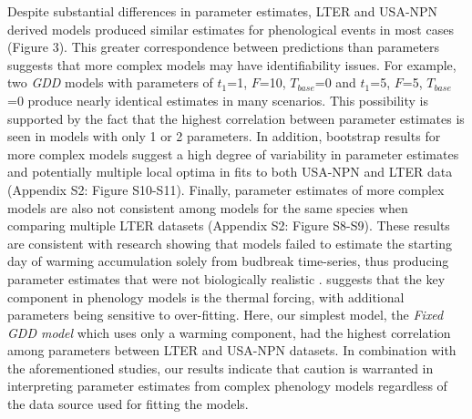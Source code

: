 \documentclass[fleqn,12pt,lineno]{article}
\begin{document}
Despite substantial differences in parameter estimates, LTER and USA-NPN derived models produced similar estimates for phenological events in most cases (Figure 3). This greater correspondence between predictions than parameters suggests that more complex models may have identifiability issues. For example, two \textit{GDD} models with parameters of $t_{1}$=1, $F$=10, $T_{base}$=0 and $t_{1}$=5, $F$=5, $T_{base}$=0 produce nearly identical estimates in many scenarios. This possibility is supported by the fact that the highest correlation between parameter estimates is seen in models with only 1 or 2 parameters. In addition, bootstrap results for more complex models suggest a high degree of variability in parameter estimates and potentially multiple local optima in fits to both USA-NPN and LTER data (Appendix S2: Figure S10-S11). Finally, parameter estimates of more complex models are also not consistent among models for the same species when comparing multiple LTER datasets (Appendix S2: Figure S8-S9). These results are consistent with research showing that models failed to estimate the starting day of warming accumulation solely from budbreak time-series, thus producing parameter estimates that were not biologically realistic \citep{chuine2016}. \cite{basler2016} suggests that the key component in phenology models is the thermal forcing, with additional parameters being sensitive to over-fitting. Here, our simplest model, the \textit{Fixed GDD model} which uses only a warming component, had the highest correlation among parameters between LTER and USA-NPN datasets. In combination with the aforementioned studies, our results indicate that caution is warranted in interpreting parameter estimates from complex phenology models regardless of the data source used for fitting the models.
\end{document}
